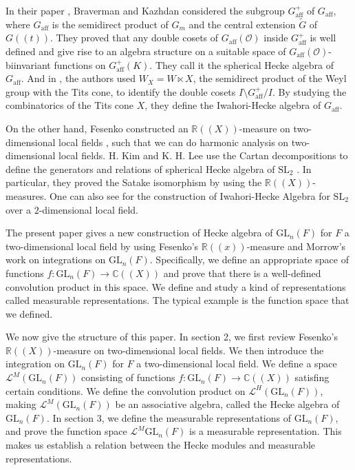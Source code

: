 \documentclass{amsart}
\theoremstyle{definition}
\theoremstyle{remark}
\numberwithin{equation}{section}
\def  \GL        {\mathrm{GL}}
\def  \cl       {\mathcal{L}}
\def  \co       {\mathcal{O}}
\def  \bc       {\mathbb{C}}
\def  \br       {\mathbb{R}}
\begin{document}
 In  their paper \cite{braverman2011spherical},  Braverman and Kazhdan considered the subgroup $G^{+}_{\mathrm{aff}}$ of $G_{\mathrm{aff}}$, where $G_{\mathrm{aff}}$ is the semidirect product of $G_m$ and   the central  extension $\widetilde{G}$  of $G((t))$. They proved that any double cosets of $G_{\mathrm{aff}}(\co)$ inside $G^{+}_{\mathrm{aff}}$ is well defined and give rise to an algebra structure on a suitable space of $G_{\mathrm{aff}}(\co)$-biinvariant functions on $G^+_{\mathrm{aff}}(K)$. They call it the spherical Hecke algebra of $G_{\mathrm{aff}}$. And in \cite{braverman2016iwahori}, the authors used $W_X = W \ltimes X$, the semidirect product of the Weyl group with the Tits cone, to identify the double cosets $I \setminus   G^+_{\mathrm{aff}} /I$. By studying the combinatorics of the Tits cone $X$, they define the Iwahori-Hecke algebra of $G_{\mathrm{aff}}$.


On the other hand,  Fesenko constructed an $\br((X))$-measure on two-dimensional local fields \cite{fesenko2003analysis}, such that we can do harmonic analysis on two-dimensional local fields.  H. Kim and K. H. Lee use the Cartan decompositions to define the generators and relations of spherical Hecke algebra of $\mathrm{SL}_2$ \cite{kim2004spherical}. In particular, they proved the Satake isomorphism by using the $\br((X))$-measures.  One can also see \cite{lee2010iwahori} for the construction of Iwahori-Hecke Algebra for $\mathrm{SL}_2$ over a $2$-dimensional local field. 


The present paper gives a new construction of Hecke algebra of $\GL_n(F)$ for $F$ a two-dimensional local field by using Fesenko's  $\br((x))$-measure and Morrow's work \cite{morrow2008integration} on integrations on $\GL_n(F)$. Specifically, we define an appropriate space of functions $f:  \GL_n(F) \to \bc((X))$ and prove that there is a well-defined convolution product in this space. We define and study a kind of representations called measurable representations. The typical example is the function space that we defined.  


We now give the structure of this paper. In section 2, we first review  Fesenko's $\br((X))$-measure on two-dimensional local fields. We then introduce the integration on $\GL_n(F)$ for $F$ a two-dimensional local field. We define a space $\cl^M(\GL_n(F))$ consisting of functions $f: \GL_n(F) \to   \bc((X))$ satisfing certain conditions. We define the convolution product on $\cl^{H}(\GL_n(F))$, making $\cl^M(\GL_n(F))$  be an associative algebra, called the Hecke algebra of $\GL_n(F)$. In section 3, we define the measurable representations of $\GL_n(F)$, and prove the function space  $\cl^M{\GL_n(F)}$ is a measurable representation. This makes us establish a relation between the Hecke modules and measurable representations.  
    
\end{document}
